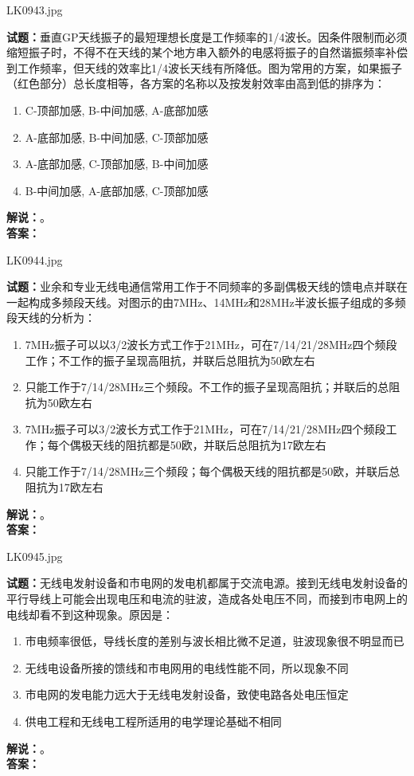 \documentclass{ctexbook}
\begin{document}
\bigskip

LK0943.jpg

\noindent\textbf{试题：}垂直GP天线振子的最短理想长度是工作频率的1/4波长。因条件限制而必须缩短振子时，不得不在天线的某个地方串入额外的电感将振子的自然谐振频率补偿到工作频率，但天线的效率比1/4波长天线有所降低。图为常用的方案，如果振子（红色部分）总长度相等，各方案的名称以及按发射效率由高到低的排序为：
\begin{enumerate}[leftmargin=3em]
  \item C-顶部加感, B-中间加感, A-底部加感
  \item A-底部加感, B-中间加感, C-顶部加感
  \item A-底部加感, C-顶部加感, B-中间加感
  \item B-中间加感, A-底部加感, C-顶部加感
\end{enumerate}
\noindent\textbf{解说：}\textbf{}。\\\noindent\textbf{答案：}

\bigskip

LK0944.jpg

\noindent\textbf{试题：}业余和专业无线电通信常用工作于不同频率的多副偶极天线的馈电点并联在一起构成多频段天线。对图示的由7\unit{\MHz}、14\unit{\MHz}和28\unit{\MHz}半波长振子组成的多频段天线的分析为：
\begin{enumerate}[leftmargin=3em]
  \item 7\unit{\MHz}振子可以以3/2波长方式工作于21\unit{\MHz}，可在7/14/21/28\unit{\MHz}四个频段工作；不工作的振子呈现高阻抗，并联后总阻抗为50欧左右
  \item 只能工作于7/14/28\unit{\MHz}三个频段。不工作的振子呈现高阻抗；并联后的总阻抗为50欧左右
  \item 7\unit{\MHz}振子可以3/2波长方式工作于21\unit{\MHz}，可在7/14/21/28\unit{\MHz}四个频段工作；每个偶极天线的阻抗都是50欧，并联后总阻抗为17欧左右
  \item 只能工作于7/14/28\unit{\MHz}三个频段；每个偶极天线的阻抗都是50欧，并联后总阻抗为17欧左右
\end{enumerate}
\noindent\textbf{解说：}\textbf{}。\\\noindent\textbf{答案：}

\bigskip

LK0945.jpg

\noindent\textbf{试题：}无线电发射设备和市电网的发电机都属于交流电源。接到无线电发射设备的平行导线上可能会出现电压和电流的驻波，造成各处电压不同，而接到市电网上的电线却看不到这种现象。原因是：
\begin{enumerate}[leftmargin=3em]
  \item 市电频率很低，导线长度的差别与波长相比微不足道，驻波现象很不明显而已
  \item 无线电设备所接的馈线和市电网用的电线性能不同，所以现象不同
  \item 市电网的发电能力远大于无线电发射设备，致使电路各处电压恒定
  \item 供电工程和无线电工程所适用的电学理论基础不相同
\end{enumerate}
\noindent\textbf{解说：}\textbf{}。\\\noindent\textbf{答案：}
\end{document}

